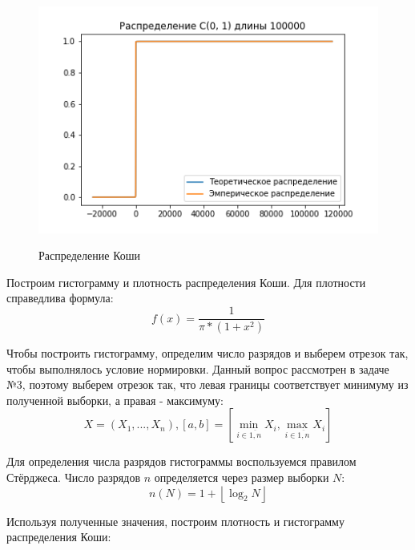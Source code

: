 \documentclass{article}
\begin{document}
\begin{figure}[h]
{    \includegraphics[scale=0.39]{./Task2/Task_2_Cauchy100000.png}
}
\caption{Распределение Коши}
\label{fig:image}
\end{figure}

Построим гистограмму и плотность распределения Коши. Для плотности справедлива формула:
\[f(x) = \frac{1}{\pi*\left(1+x^2\right)}\]

Чтобы построить гистограмму,  определим число разрядов и выберем отрезок так, чтобы
выполнялось условие нормировки. Данный вопрос рассмотрен в задаче №3, поэтому выберем отрезок
так, что левая границы соответствует минимуму из полученной выборки, а правая - максимуму:
\[X = \left(X_1, ..., X_n\right), [a,b] = \left[\min_{i \in \overline{1,n}}X_i,
\max_{i \in \overline{1, n}}{X_i}\right]\]

Для определения числа разрядов гистограммы воспользуемся правилом Стёрджеса. Число разрядов
$n$ определяется через размер выборки $N$:
\[n(N) = 1+\left\lfloor{\log_2N}\right\rfloor\]

Используя полученные значения, построим плотность и гистограмму распределения Коши:
\end{document}
